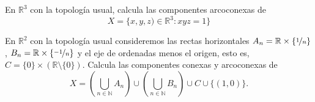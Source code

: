 \begin{ejercicio}
    En $\mathbb{R}^3$ con la topología usual, calcula las componentes arcoconexas de
    \begin{equation*}
        X = \{x,y,z) \in \mathbb{R}^3 : xyz = 1\}
    \end{equation*}
\end{ejercicio}

\begin{ejercicio}
    En $\mathbb{R}^2$ con la topología usual consideremos las rectas horizontales $A_n = \mathbb{R}\times \{\nicefrac{1}{n}\}$, $B_n = \mathbb{R}\times \{\nicefrac{-1}{n}\}$ y el eje de ordenadas menos el origen, esto es, $C=\{0\}\times (\mathbb{R}\setminus \{0\})$. Calcula las componentes conexas y arcoconexas de
    \begin{equation*}
        X = \left(\bigcup_{n\in \mathbb{N}}A_n\right) \cup \left(\bigcup_{n\in \mathbb{N}}B_n\right) \cup C \cup \{(1,0)\}.
    \end{equation*}
\end{ejercicio}

